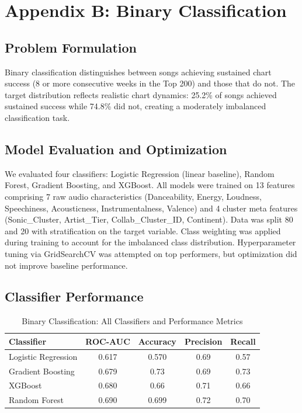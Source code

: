 \documentclass{article}
\begin{document}
\section*{Appendix B: Binary Classification}
\label{app:binary}
\subsection*{Problem Formulation}

Binary classification distinguishes between songs achieving sustained chart success (8 or more consecutive weeks in the Top 200) and those that do not. The target distribution reflects realistic chart dynamics: 25.2\% of songs achieved sustained success while 74.8\% did not, creating a moderately imbalanced classification task.
\subsection*{Model Evaluation and Optimization}

We evaluated four classifiers: Logistic Regression (linear baseline), Random Forest, Gradient Boosting, and XGBoost. All models were trained on 13 features comprising 7 raw audio characteristics (Danceability, Energy, Loudness, Speechiness, Acousticness, Instrumentalness, Valence) and 4 cluster meta features (Sonic\_Cluster, Artist\_Tier, Collab\_Cluster\_ID, Continent). Data was split 80 and 20 with stratification on the target variable. Class weighting was applied during training to account for the imbalanced class distribution. Hyperparameter tuning via GridSearchCV was attempted on top performers, but optimization did not improve baseline performance.

\subsection*{Classifier Performance}
\begin{table}[h]
\centering
\caption{Binary Classification: All Classifiers and Performance Metrics}
\label{tab:binary_all_classifiers}
\begin{tabular}{lcccc}
\toprule
\textbf{Classifier} & \textbf{ROC-AUC} & \textbf{Accuracy} & \textbf{Precision} & \textbf{Recall} \\
\midrule
Logistic Regression & 0.617 & 0.570 & 0.69 & 0.57 \\
Gradient Boosting & 0.679 & 0.73 & 0.69 & 0.73 \\
XGBoost & 0.680 & 0.66 & 0.71 & 0.66 \\
Random Forest & 0.690 & 0.699 & 0.72 & 0.70 \\
\bottomrule
\end{tabular}
\end{table}
\end{document}
